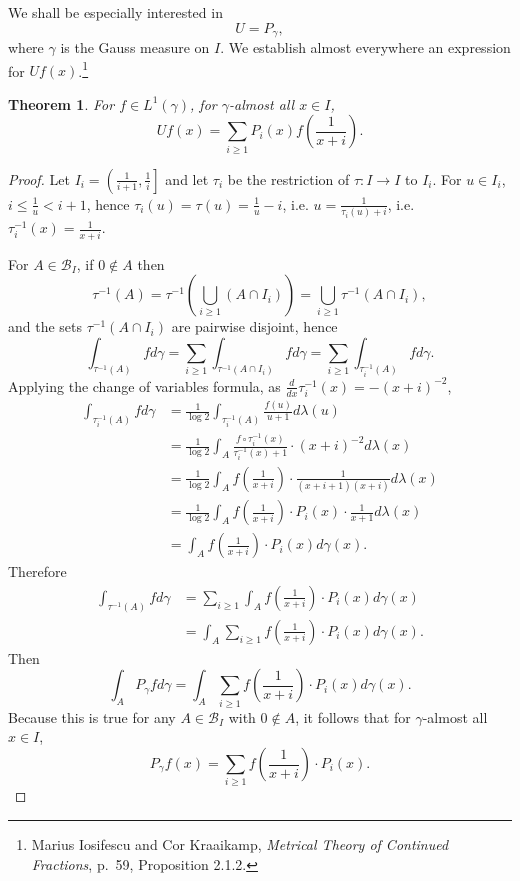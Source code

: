 \documentclass{article}
\newtheorem{theorem}{Theorem}
\theoremstyle{definition}
\begin{document}
We shall be especially interested in
\[
U=P_\gamma,
\]
where $\gamma$ is the Gauss measure on $I$. We establish almost everywhere an expression for $Uf(x)$.\footnote{Marius Iosifescu and Cor Kraaikamp,
{\em Metrical Theory of Continued Fractions}, p.~59, Proposition 2.1.2.}

\begin{theorem}
For $f \in L^1(\gamma)$, for $\gamma$-almost all $x \in I$,
\[
Uf(x) = \sum_{i \geq 1} P_i(x) f \left( \frac{1}{x+i} \right).
\]
\end{theorem}
\begin{proof}
Let $I_i = \left(\frac{1}{i+1},\frac{1}{i}\right]$ and let $\tau_i$ be the restriction of $\tau:I \to I$ to $I_i$.
For $u \in I_i$, $i \leq \frac{1}{u} < i+1$, hence $\tau_i(u)=\tau(u) = \frac{1}{u}-i$,
i.e. $u=\frac{1}{\tau_i(u)+i}$, i.e. $\tau_i^{-1}(x) = \frac{1}{x+i}$.


For $A \in \mathscr{B}_I$, if $0 \not \in A$ then 
\[
\tau^{-1}(A) = \tau^{-1}\left(\bigcup_{i \geq 1} (A \cap I_i) \right)
=\bigcup_{i \geq 1} \tau^{-1}(A \cap I_i),
\]
and the sets $\tau^{-1}(A \cap I_i)$ are pairwise disjoint, hence
\[
\int_{\tau^{-1}(A)} f d\gamma=\sum_{i \geq 1} \int_{\tau^{-1}(A \cap I_i)}  f d\gamma
=\sum_{i \geq 1} \int_{\tau_i^{-1}(A)}  f d\gamma.
\]
Applying the change of variables formula, as $\frac{d}{dx} \tau_i^{-1}(x) = -(x+i)^{-2}$,
\begin{align*}
\int_{\tau_i^{-1}(A)}  f d\gamma&=\frac{1}{\log 2} \int_{\tau_i^{-1}(A)} \frac{f(u)}{u+1} d\lambda(u)\\
&=\frac{1}{\log 2} \int_A \frac{f \circ \tau_i^{-1}(x)}{\tau_i^{-1}(x)+1} \cdot (x+i)^{-2} d\lambda(x)\\
&=\frac{1}{\log 2} \int_A f\left(\frac{1}{x+i}\right) \cdot \frac{1}{(x+i+1)(x+i)} d\lambda(x)\\
&=\frac{1}{\log 2} \int_A  f\left(\frac{1}{x+i}\right) \cdot P_i(x) \cdot \frac{1}{x+1} d\lambda(x)\\
&=\int_A    f\left(\frac{1}{x+i}\right) \cdot P_i(x) d\gamma(x).
\end{align*}
Therefore
\begin{align*}
\int_{\tau^{-1}(A)} f d\gamma&=\sum_{i \geq 1} \int_A    f\left(\frac{1}{x+i}\right) \cdot P_i(x) d\gamma(x)\\
&= \int_A \sum_{i \geq 1}  f\left(\frac{1}{x+i}\right) \cdot P_i(x) d\gamma(x).
\end{align*}
Then
\[
\int_A P_\gamma f d\gamma =  \int_A \sum_{i \geq 1}  f\left(\frac{1}{x+i}\right) \cdot P_i(x) d\gamma(x).
\]
Because this is true for any $A \in \mathscr{B}_I$ with $0 \not \in A$, it follows that
for $\gamma$-almost all $x \in I$,
\[
P_\gamma f(x) =  \sum_{i \geq 1}  f\left(\frac{1}{x+i}\right) \cdot P_i(x).
\]
\end{proof}
\end{document}
